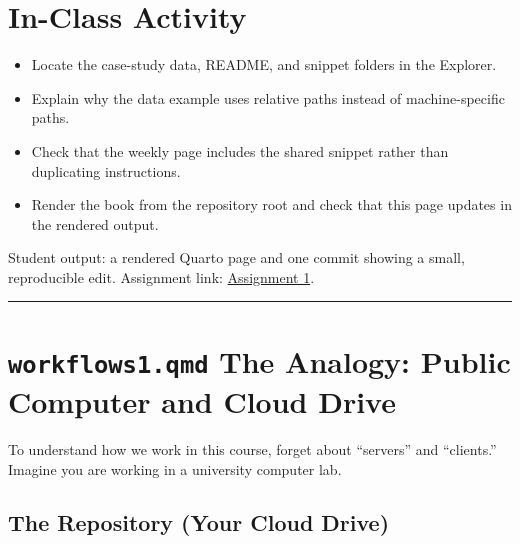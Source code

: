 \documentclass[
  letterpaper,
  DIV=11,
  numbers=noendperiod,
  oneside]{scrreprt}
\providecommand{\tightlist}{%
  \setlength{\itemsep}{0pt}\setlength{\parskip}{0pt}}
\begin{document}
\section*{In-Class Activity}\label{in-class-activity-1}


\begin{itemize}
\tightlist
\item
  Locate the case-study data, README, and snippet folders in the
  Explorer.
\item
  Explain why the data example uses relative paths instead of
  machine-specific paths.
\item
  Check that the weekly page includes the shared snippet rather than
  duplicating instructions.
\item
  Render the book from the repository root and check that this page
  updates in the rendered output.
\end{itemize}

Student output: a rendered Quarto page and one commit showing a small,
reproducible edit. Assignment link:
\href{../../assignments/assignment01-workflows/README.md}{Assignment 1}.

\begin{center}\rule{0.5\linewidth}{0.5pt}\end{center}

\section*{\texorpdfstring{\texttt{workflows1.qmd} The Analogy: Public
Computer and Cloud
Drive}{workflows1.qmd The Analogy: Public Computer and Cloud Drive}}\label{workflows1.qmd-the-analogy-public-computer-and-cloud-drive}


To understand how we work in this course, forget about ``servers'' and
``clients.'' Imagine you are working in a university computer lab.

\subsection*{The Repository (Your Cloud
Drive)}\label{the-repository-your-cloud-drive}
\end{document}
